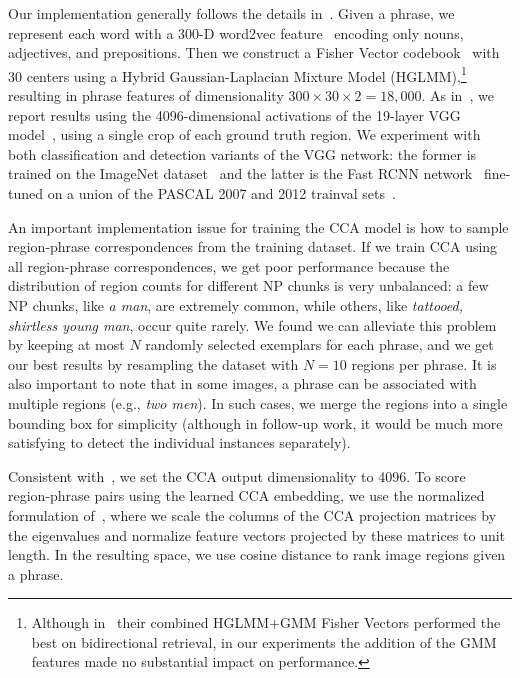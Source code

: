 \documentclass[twocolumn]{svjour3}
\begin{document}
Our implementation generally follows the details in~\cite{klein2014fisher}. Given a phrase, we represent each word with a 300-D word2vec feature~\citep{mikolov2013distributed} encoding only nouns, adjectives, and prepositions. Then we construct a Fisher Vector codebook~\citep{perronnin2010improving} with 30 centers using a Hybrid Gaussian-Laplacian Mixture Model (HGLMM),\footnote{Although in~\citet{klein2014fisher} their combined HGLMM+GMM Fisher Vectors performed the best on bidirectional retrieval, in our experiments the addition of the GMM features made no substantial impact on performance.} resulting in phrase features of dimensionality $300 \times 30\times 2=18,000$.   As in~\citet{klein2014fisher}, we report results using the 4096-dimensional activations of the 19-layer VGG model~\citep{simonyan2014very}, using a single crop of each ground truth region. We experiment with both classification and detection variants of the VGG network: the former is trained on the ImageNet dataset~\citep{deng2009imagenet} and the latter is the Fast RCNN network~\citep{girshickICCV15fastrcnn} fine-tuned on a union of the PASCAL 2007 and 2012 trainval sets~\citep{pascal-voc-2012}.  

An important implementation issue for training the CCA model is how to sample region-phrase correspondences from the training dataset. If we train CCA using all region-phrase correspondences, we get poor performance because the distribution of region counts for different NP chunks is very unbalanced: a few NP chunks, like {\em a man}, are extremely common, while others, like {\em tattooed, shirtless young man}, occur quite rarely. We found we can alleviate this problem by keeping at most $N$ randomly selected exemplars for each phrase, and we get our best results by resampling the dataset with $N=10$ regions per phrase. It is also important to note that in some images, a phrase can be associated with multiple regions (e.g., {\em two men}). In such cases, we merge the regions into a single bounding box for simplicity (although in follow-up work, it would be much more satisfying to detect the individual instances separately). 

Consistent with~\cite{klein2014fisher}, we set the CCA output dimensionality to 4096. To score region-phrase pairs using the learned CCA embedding, we use the normalized formulation of~\citet{Gong2014}, where we scale the columns of the CCA projection matrices by the eigenvalues and normalize feature vectors projected by these matrices to unit length. In the resulting space, we use cosine distance to rank image regions given a phrase.
\end{document}
